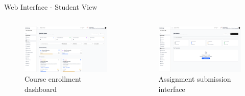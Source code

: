 \documentclass[aspectratio=169]{beamer}
\begin{document}
\begin{frame}{Web Interface - Student View}
    \begin{columns}
        \begin{figure}
            \includegraphics[width=\textwidth,height=0.55\textheight,keepaspectratio]{../pfe-pics/student/Screenshot 2025-06-09 at 22-45-09 Vite React TS.png}
            \caption{Course enrollment dashboard}
        \end{figure}
        \begin{figure}
            \includegraphics[width=\textwidth,height=0.55\textheight,keepaspectratio]{../pfe-pics/student/Screenshot 2025-06-09 at 22-46-22 Vite React TS.png}
            \caption{Assignment submission interface}
        \end{figure}
    \end{columns}
\end{frame}
\end{document}
